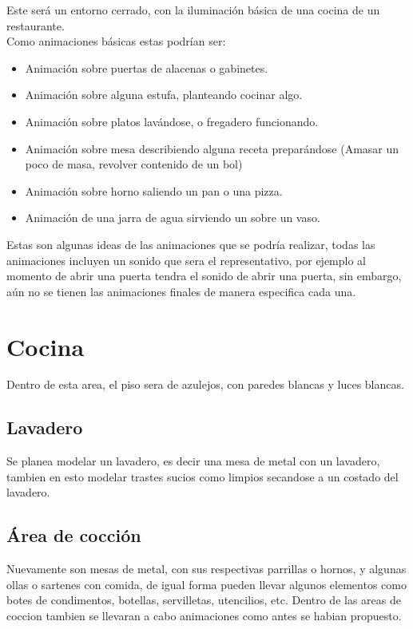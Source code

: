 \documentclass[letter,12pt]{article}
\begin{document}
Este será un entorno cerrado, con la iluminación básica de una cocina de un restaurante.\\
Como animaciones básicas estas podrían ser:
\begin{itemize}
\item Animación sobre puertas de alacenas o gabinetes.
\item Animación sobre alguna estufa, planteando cocinar algo.
\item Animación sobre platos lavándose, o fregadero funcionando.
\item Animación sobre mesa describiendo alguna receta preparándose (Amasar un poco de masa, revolver contenido de un bol)
\item Animación sobre horno saliendo un pan o una pizza.
\item Animación de una jarra de agua sirviendo un sobre un vaso.

\end{itemize}
Estas son algunas ideas de las animaciones que se podría realizar, todas las animaciones incluyen un sonido que sera el representativo, por ejemplo al momento de abrir una puerta tendra el sonido de abrir una puerta, sin embargo, aún no se tienen las animaciones finales de manera especifica cada una.\\

\section{Cocina}
Dentro de esta area, el piso sera de azulejos, con paredes blancas y luces blancas.

\subsection{Lavadero}
Se planea modelar un lavadero, es decir una mesa de metal con un lavadero, tambien en esto modelar trastes sucios como limpios secandose a un costado del lavadero.

\subsection{Área de cocción}
Nuevamente son mesas de metal, con sus respectivas parrillas o hornos, y algunas ollas o sartenes con comida, de igual forma pueden llevar algunos elementos como botes de condimentos, botellas, servilletas, utencilios, etc.
Dentro de las areas de coccion tambien se llevaran a cabo animaciones como antes se habian propuesto.
\end{document}
